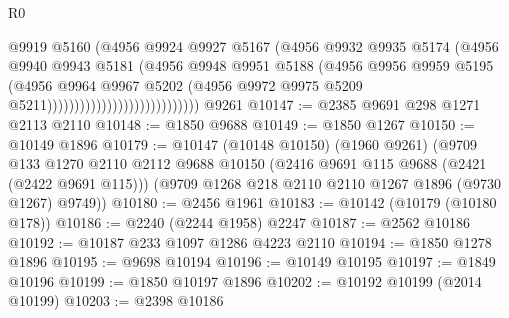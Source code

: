 \begin{lexlean}{R0}
\begin{coremodule}
                                              @9919
                                              @5160
                                              (@4956
                                                @9924
                                                @9927
                                                @5167
                                                (@4956
                                                  @9932
                                                  @9935
                                                  @5174
                                                  (@4956
                                                    @9940
                                                    @9943
                                                    @5181
                                                    (@4956
                                                      @9948
                                                      @9951
                                                      @5188
                                                      (@4956
                                                        @9956
                                                        @9959
                                                        @5195
                                                        (@4956
                                                          @9964
                                                          @9967
                                                          @5202
                                                          (@4956
                                                            @9972
                                                            @9975
                                                            @5209
                                                            @5211))))))))))))))))))))))))))))
    @9261
@10147 := @2385 @9691 @298 @1271 @2113 @2110
@10148 := @1850 @9688
@10149 := @1850 @1267
@10150 := @10149 @1896
@10179 := @10147
    (@10148 @10150)
    (@1960 @9261)
    (@9709
      @133
      @1270
      @2110
      @2112
      @9688
      @10150
      (@2416 @9691 @115 @9688 (@2421 (@2422 @9691 @115)))
      (@9709 @1268 @218 @2110 @2110 @1267 @1896 (@9730 @1267) @9749))
@10180 := @2456 @1961
@10183 := @10142 (@10179 (@10180 @178))
@10186 := @2240 (@2244 @1958) @2247
@10187 := @2562 @10186
@10192 := @10187 @233 @1097 @1286 @4223 @2110
@10194 := @1850 @1278 @1896
@10195 := @9698 @10194
@10196 := @10149 @10195
@10197 := @1849 @10196
@10199 := @1850 @10197 @1896
@10202 := @10192 @10199 (@2014 @10199)
@10203 := @2398 @10186

\end{coremodule}
\end{lexlean}
